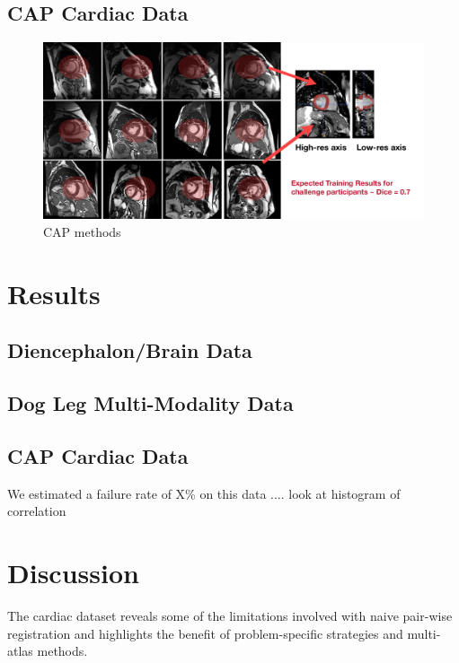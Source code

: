 \documentclass{llncs}
\begin{document}
\subsection{CAP Cardiac Data}
\begin{figure}[t]
 \centering 
  \includegraphics[width=5in]{../figs/CAP_methods.pdf}
 \caption{CAP methods}
 \label{fig:CAPmethods}
\end{figure}

\section{Results}

\subsection{Diencephalon/Brain Data}

\subsection{Dog Leg Multi-Modality Data}

\subsection{CAP Cardiac Data}
We estimated a failure rate of X\% on this data  .... look at
histogram of correlation 

\section{Discussion}

The cardiac dataset reveals some of the limitations involved with naive
pair-wise registration and highlights the benefit of
problem-specific strategies and multi-atlas methods.  



\end{document}
